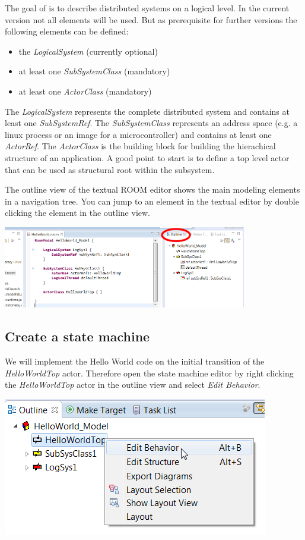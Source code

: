 The goal of \eTrice{} is to describe distributed systems on a logical level. In the current version not all 
elements will be used. But as prerequisite for further versions the following elements can be defined:
\begin{itemize}
\item the \textit{LogicalSystem} (currently optional)
\item at least one \textit{SubSystemClass} (mandatory)
\item at least one \textit{ActorClass} (mandatory)
\end{itemize}

The \textit{LogicalSystem} represents the complete distributed system and contains at least one 
\textit{SubSystemRef}. The \textit{SubSystemClass} represents an address space (e.g. a linux process or an image for a microcontroller) and contains at least one 
\textit{ActorRef}. The \textit{ActorClass} is the building block for building the hierachical structure of an application. 
A good point to start is to define a top level actor that can be used as structural root within the subsystem.

The outline view of the textual ROOM editor shows the main modeling elements in a navigation tree. You can jump to an element in the textual editor by double clicking the element in the outline view.

\includegraphics[width=0.8\textwidth]{images/015-HelloWorld02.png}

\subsection{Create a state machine}

We will implement the Hello World code on the initial transition of the \textit{HelloWorldTop} actor. 
Therefore open the state machine editor by right clicking the \textit{HelloWorldTop} actor in the outline view and select \textit{Edit Behavior}.

\includegraphics{images/015-HelloWorld03.png}

